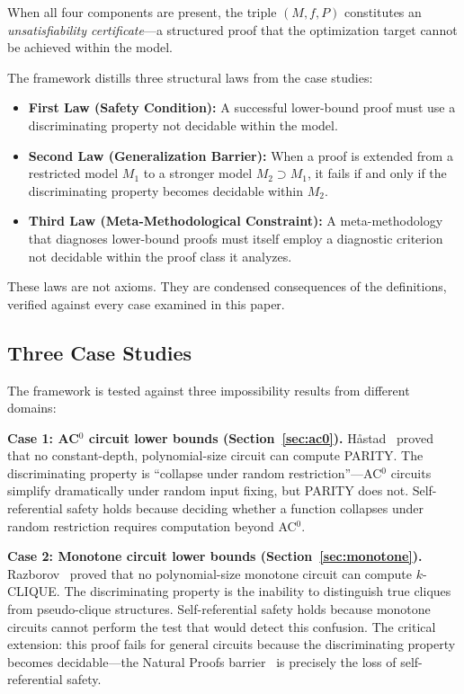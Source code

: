 \documentclass[11pt,a4paper]{article}
\theoremstyle{plain}
\theoremstyle{definition}
\theoremstyle{remark}
\begin{document}
When all four components are present, the triple $(M, f, P)$ constitutes an \emph{unsatisfiability certificate}---a structured proof that the optimization target cannot be achieved within the model.

The framework distills three structural laws from the case studies:

\begin{itemize}
\item \textbf{First Law (Safety Condition):} A successful lower-bound proof must use a discriminating property not decidable within the model.
\item \textbf{Second Law (Generalization Barrier):} When a proof is extended from a restricted model $M_1$ to a stronger model $M_2 \supset M_1$, it fails if and only if the discriminating property becomes decidable within $M_2$.
\item \textbf{Third Law (Meta-Methodological Constraint):} A meta-methodology that diagnoses lower-bound proofs must itself employ a diagnostic criterion not decidable within the proof class it analyzes.
\end{itemize}

These laws are not axioms. They are condensed consequences of the definitions, verified against every case examined in this paper.

\subsection{Three Case Studies}

The framework is tested against three impossibility results from different domains:

\textbf{Case 1: AC$^0$ circuit lower bounds (Section~\ref{sec:ac0}).} H\r{a}stad~\cite{Hastad1986} proved that no constant-depth, polynomial-size circuit can compute PARITY. The discriminating property is ``collapse under random restriction''---AC$^0$ circuits simplify dramatically under random input fixing, but PARITY does not. Self-referential safety holds because deciding whether a function collapses under random restriction requires computation beyond AC$^0$.

\textbf{Case 2: Monotone circuit lower bounds (Section~\ref{sec:monotone}).} Razborov~\cite{Razborov1985} proved that no polynomial-size monotone circuit can compute $k$-CLIQUE. The discriminating property is the inability to distinguish true cliques from pseudo-clique structures. Self-referential safety holds because monotone circuits cannot perform the test that would detect this confusion. The critical extension: this proof fails for general circuits because the discriminating property becomes decidable---the Natural Proofs barrier~\cite{RazborovRudich1994} is precisely the loss of self-referential safety.
\end{document}
